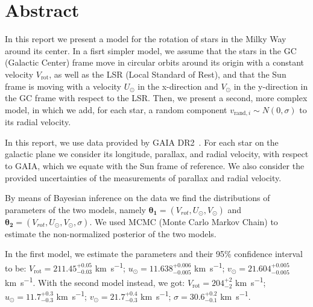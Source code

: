 \section*{Abstract}

In this report we present a model for the rotation of stars in the Milky Way around its center.
In a fisrt simpler model, we assume that the stars in the GC (Galactic Center) frame move in circular orbits around its origin with a constant velocity $V_{\text{rot}}$, as well as the LSR (Local Standard of Rest), and that the Sun frame is moving with a velocity $U_{\odot}$ in the x-direction and $V_{\odot}$ in the y-direction in the GC frame with respect to the LSR. Then, we present a second, more complex model, in which we add, for each star, a random component $v_{\text{rand}, i} \sim N(0, \sigma)$ to its radial velocity.



In this report, we use data provided by GAIA DR2~\cite{GAIADR2}.
For each star on the galactic plane we consider its longitude, parallax, and radial velocity, with respect to GAIA, which we equate with the Sun frame of reference.
We also consider the provided uncertainties of the measurements of parallax and radial velocity.

By means of Bayesian inference on the data we find the distributions of parameters of the two models, namely $\mathbf{\theta_1} = (V_{rot}, U_{\odot}, V_{\odot})$ and $\mathbf{\theta_2} = (V_{rot}, U_{\odot}, V_{\odot}, \sigma)$.
We used MCMC (Monte Carlo Markov Chain) to estimate the non-normalized posterior of the two models. 

In the first model, we estimate the parameters and their 95\% confidence interval to be: %
$V_{\text{rot}} = 211.45_{-0.03}^{+0.05}$ \unit{\kilo\meter\per\second};  
$u_{\odot} = 11.638_{-0.005}^{+0.006}$ \unit{\kilo\meter\per\second};  
$v_{\odot} = 21.604_{-0.005}^{+0.005}$ \unit{\kilo\meter\per\second}.  
With the second model instead, we got:  
$V_{\text{rot}} = 204_{-2}^{+2}$ \unit{\kilo\meter\per\second};  
$u_{\odot} = 11.7_{-0.3}^{+0.3}$ \unit{\kilo\meter\per\second};  
$v_{\odot} = 21.7_{-0.3}^{+0.4}$ \unit{\kilo\meter\per\second};  
$\sigma = 30.6_{-0.1}^{+0.2}$ \unit{\kilo\meter\per\second}.  

